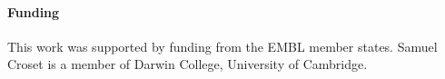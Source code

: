 \documentclass{bioinfo}
\begin{document}
\paragraph{Funding\textcolon}
This work was supported by funding from the EMBL member states. Samuel Croset is a member of Darwin College, University of Cambridge.









 

\end{document}
